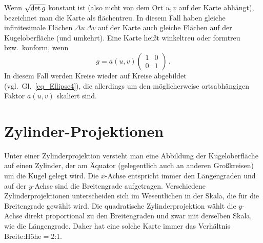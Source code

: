 Wenn $\sqrt{{\rm det}\,g}$ konstant ist (also nicht von dem Ort $u,v$ auf der Karte abh\"angt), bezeichnet
man die Karte als fl\"achentreu. 
In diesem Fall haben gleiche infinitesimale Fl\"achen $\Delta u \, \Delta v $ auf der Karte auch
gleiche Fl\"achen auf der Kugeloberfl\"ache (und umkehrt). 
Eine Karte hei\ss t winkeltreu oder formtreu bzw.\ konform, wenn 
\begin{equation}
                       g =  a(u,v) \left( \begin{array}{cc}  1 & 0 \\ 0 & 1 \end{array}   \right) \, . 
\end{equation}
In diesem Fall werden Kreise wieder auf Kreise abgebildet (vgl.\ Gl.\ \ref{eq_Ellipse4}), die allerdings um den 
m\"oglicherweise ortsabh\"angigen Faktor $a(u,v)$ skaliert sind.
      
\section{Zylinder-Projektionen}

Unter einer Zylinderprojektion 
versteht man eine Abbildung der Kugeloberfl\"ache auf einen Zylinder,
der am \"Aquator (gelegentlich auch an anderen Gro\ss kreisen) 
um die Kugel gelegt wird. Die $x$-Achse entspricht immer den
L\"angengraden und auf der $y$-Achse sind die Breitengrade aufgetragen. Verschiedene Zylinderprojektionen
unterscheiden sich im Wesentlichen in der Skala, die f\"ur die Breitengrade gew\"ahlt wird. 
Die quadratische Zylinderprojektion 
w\"ahlt die $y$-Achse direkt proportional zu den Breitengraden
und zwar mit derselben Skala, wie die L\"angengrade. Daher hat eine solche Karte immer das
Verh\"altnis Breite:H\"ohe$=$2:1.  

